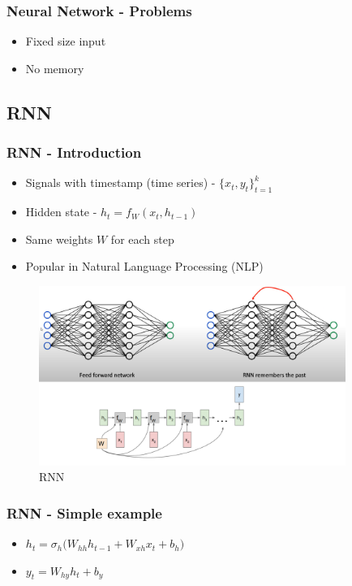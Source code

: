 \documentclass[12pt]{report}
\begin{document}
\subsubsection{Neural Network - Problems}


\begin{itemize}
	\item Fixed size input
	\item No memory
\end{itemize}


\newpage
\subsection{RNN}

\subsubsection{RNN - Introduction}
\begin{itemize}
	\item Signals with timestamp (time series) - $\{x_t, y_t \}_{t=1}^k$
	\item Hidden state - $h_t = f_{W}(x_t, h_{t-1})$
	\item Same weights $W$ for each step
	\item Popular in Natural Language Processing (NLP)
\end{itemize}
\begin{figure}[H]\centering\includegraphics[width=10cm]{RNN.png}\caption{RNN}\end{figure}


\subsubsection{RNN - Simple example}

\begin{itemize}
	\item $h_t = \sigma_h \big(W_{hh} h_{t-1} +  W_{xh} x_{t} + b_h\big)$
	\item $y_t  = W_{hy} h_{t} +  b_y$
\end{itemize}
\end{document}
